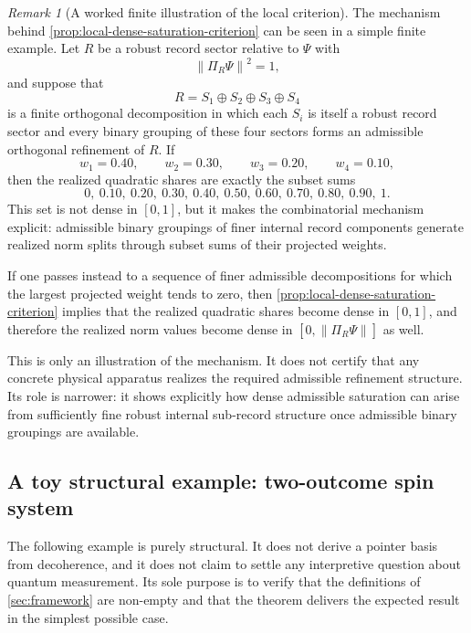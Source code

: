 \documentclass[11pt]{article}
\theoremstyle{remark}
\newtheorem{remark}{Remark}
\numberwithin{equation}{section}
\newcommand{\Proj}[1]{\Pi_{#1}}
\newcommand{\norm}[1]{\left\lVert #1 \right\rVert}
\begin{document}
\begin{remark}[A worked finite illustration of the local criterion]
The mechanism behind \cref{prop:local-dense-saturation-criterion} can
be seen in a simple finite example. Let \(R\) be a robust record
sector relative to \(\Psi\) with
\[
\norm{\Proj{R}\Psi}^2 = 1,
\]
and suppose that
\[
R = S_1 \oplus S_2 \oplus S_3 \oplus S_4
\]
is a finite orthogonal decomposition in which each \(S_i\) is itself a
robust record sector and every binary grouping of these four sectors
forms an admissible orthogonal refinement of \(R\). If
\[
w_1 = 0.40,\qquad
w_2 = 0.30,\qquad
w_3 = 0.20,\qquad
w_4 = 0.10,
\]
then the realized quadratic shares are exactly the subset sums
\[
0,\ 0.10,\ 0.20,\ 0.30,\ 0.40,\ 0.50,\ 0.60,\ 0.70,\ 0.80,\ 0.90,\ 1.
\]
This set is not dense in \([0,1]\), but it makes the combinatorial
mechanism explicit: admissible binary groupings of finer internal
record components generate realized norm splits through subset sums of
their projected weights.

If one passes instead to a sequence of finer admissible decompositions
for which the largest projected weight tends to zero, then
\cref{prop:local-dense-saturation-criterion} implies that the realized
quadratic shares become dense in \([0,1]\), and therefore the realized
norm values become dense in \([0,\norm{\Proj{R}\Psi}]\) as well.

This is only an illustration of the mechanism. It does not certify
that any concrete physical apparatus realizes the required admissible
refinement structure. Its role is narrower: it shows explicitly how
dense admissible saturation can arise from sufficiently fine robust
internal sub-record structure once admissible binary groupings are
available.
\end{remark}

\subsection{A toy structural example: two-outcome spin system}
\label{subsec:spin-example}

The following example is purely structural. It does not derive a
pointer basis from decoherence, and it does not claim to settle any
interpretive question about quantum measurement. Its sole purpose is
to verify that the definitions of \cref{sec:framework} are non-empty
and that the theorem delivers the expected result in the simplest
possible case.
\end{document}
